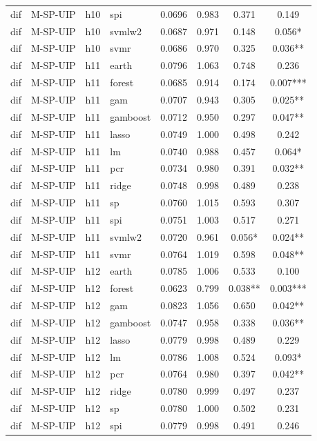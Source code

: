 \begin{ThreePartTable}
\begin{longtable}[t]{llclcccc}
dif & M-SP-UIP & h10 & spi & 0.0696 & 0.983 & 0.371 & 0.149\\
dif & M-SP-UIP & h10 & svmlw2 & 0.0687 & 0.971 & 0.148 & 0.056*\\
dif & M-SP-UIP & h10 & svmr & 0.0686 & 0.970 & 0.325 & 0.036**\\
\addlinespace
dif & M-SP-UIP & h11 & earth & 0.0796 & 1.063 & 0.748 & 0.236\\
dif & M-SP-UIP & h11 & forest & 0.0685 & 0.914 & 0.174 & 0.007***\\
dif & M-SP-UIP & h11 & gam & 0.0707 & 0.943 & 0.305 & 0.025**\\
dif & M-SP-UIP & h11 & gamboost & 0.0712 & 0.950 & 0.297 & 0.047**\\
dif & M-SP-UIP & h11 & lasso & 0.0749 & 1.000 & 0.498 & 0.242\\
dif & M-SP-UIP & h11 & lm & 0.0740 & 0.988 & 0.457 & 0.064*\\
dif & M-SP-UIP & h11 & pcr & 0.0734 & 0.980 & 0.391 & 0.032**\\
dif & M-SP-UIP & h11 & ridge & 0.0748 & 0.998 & 0.489 & 0.238\\
dif & M-SP-UIP & h11 & sp & 0.0760 & 1.015 & 0.593 & 0.307\\
dif & M-SP-UIP & h11 & spi & 0.0751 & 1.003 & 0.517 & 0.271\\
dif & M-SP-UIP & h11 & svmlw2 & 0.0720 & 0.961 & 0.056* & 0.024**\\
dif & M-SP-UIP & h11 & svmr & 0.0764 & 1.019 & 0.598 & 0.048**\\
\addlinespace
dif & M-SP-UIP & h12 & earth & 0.0785 & 1.006 & 0.533 & 0.100\\
dif & M-SP-UIP & h12 & forest & 0.0623 & 0.799 & 0.038** & 0.003***\\
dif & M-SP-UIP & h12 & gam & 0.0823 & 1.056 & 0.650 & 0.042**\\
dif & M-SP-UIP & h12 & gamboost & 0.0747 & 0.958 & 0.338 & 0.036**\\
dif & M-SP-UIP & h12 & lasso & 0.0779 & 0.998 & 0.489 & 0.229\\
dif & M-SP-UIP & h12 & lm & 0.0786 & 1.008 & 0.524 & 0.093*\\
dif & M-SP-UIP & h12 & pcr & 0.0764 & 0.980 & 0.397 & 0.042**\\
dif & M-SP-UIP & h12 & ridge & 0.0780 & 0.999 & 0.497 & 0.237\\
dif & M-SP-UIP & h12 & sp & 0.0780 & 1.000 & 0.502 & 0.231\\
dif & M-SP-UIP & h12 & spi & 0.0779 & 0.998 & 0.491 & 0.246\\

\end{longtable}
\end{ThreePartTable}
